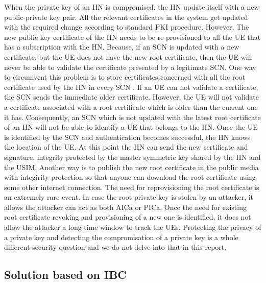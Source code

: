 \documentclass[lnicst,sechang,a4paper]{svmultln}
\begin{document}
When the private key of an HN is compromised, the HN update itself with a new public-private key pair. All the relevant certificates in the system get updated with the required change according to standard PKI procedure. However, The new public key certificate of the HN needs to be re-provisioned to all the UE that has a subscription with the HN. Because, if an SCN is updated with a new certificate, but the UE does not have the new root certificate, then the UE will never be able to validate the certificate presented by a legitimate SCN. One way to circumvent this problem is to store certificates concerned with all the root certificate used by the HN in every SCN . If an UE can not validate a certificate, the SCN sends the immediate older certificate. However, the UE will not validate a certificate associated with a root certificate which is older than the current one it has. Consequently, an SCN which is not updated with the latest root certificate of an HN will not be able to identify a UE that belongs to the HN. Once the UE is identified by the SCN and authentication becomes successful, the HN knows the location of the UE. At this point the HN can send the new certificate and signature, integrity protected by the master symmetric key shared by the HN and the USIM. Another way is to publish the new root certificate in the public media with integirity protection so that anyone can download the root certificate using some other internet connection. The need for reprovisioning the root certificate is an extremely rare event. In case the root private key is stolen by an attacker, it allows the attacker can act as both AICa or PICa. Once the need for existing root certificate revoking and provisioning of a new one is identified, it does not allow the attacker a long time window to track the UEs. Protecting the privacy of a private key and detecting the compromisation of a private key is a whole different security question and we do not delve into that in this report.


\subsection{Solution based on IBC} 
\label{sub_sec:solution_ibc}
\end{document}
